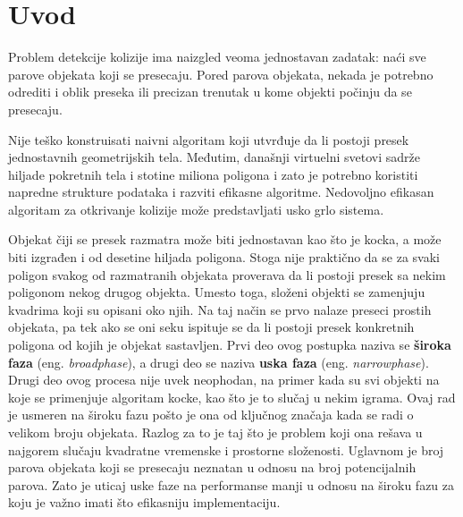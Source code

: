 \documentclass[12pt,oneside]{memoir}
\begin{document}
\frontmatter

\naslovna
\komisija

\begingroup
\vspace*{-5\baselineskip}
\tableofcontents
\endgroup

\mainmatter

\chapter{Uvod}
\label{sec:uvod}

Problem detekcije kolizije ima naizgled veoma jednostavan zadatak: naći sve parove objekata
koji se presecaju. Pored parova objekata, nekada je potrebno odrediti i oblik preseka
ili precizan trenutak u kome objekti počinju da se presecaju.

Nije teško konstruisati naivni algoritam koji utvrđuje da li postoji presek jednostavnih geometrijskih tela.
Međutim, današnji virtuelni svetovi sadrže hiljade pokretnih tela i stotine miliona poligona i 
zato je potrebno koristiti napredne strukture podataka i razviti efikasne algoritme. 
Nedovoljno efikasan algoritam za otkrivanje kolizije može predstavljati usko grlo sistema.

Objekat čiji se presek razmatra može biti jednostavan kao što je kocka, a može biti izgrađen i od desetine hiljada poligona.
Stoga nije praktično da se za svaki poligon svakog od razmatranih objekata
proverava da li postoji presek sa nekim poligonom nekog drugog objekta.
Umesto toga, složeni objekti se zamenjuju kvadrima koji su opisani oko njih.
Na taj način se prvo nalaze preseci prostih objekata, pa tek ako se oni seku ispituje se da li postoji presek konkretnih poligona od kojih je objekat sastavljen.
%
Prvi deo ovog postupka naziva se \textbf{široka faza} (eng. {\em broadphase}), a drugi deo se naziva \textbf{uska faza} (eng. {\em narrowphase}).
Drugi deo ovog procesa nije uvek neophodan, na primer kada su svi objekti na koje se primenjuje algoritam kocke, kao što je to slučaj u nekim igrama.
Ovaj rad je usmeren na široku fazu pošto je ona od ključnog značaja kada se radi o velikom broju objekata.
Razlog za to je taj što je problem koji ona rešava u najgorem slučaju kvadratne vremenske i prostorne složenosti.
Uglavnom je broj parova objekata koji se presecaju neznatan u odnosu na broj potencijalnih parova. 
Zato je uticaj uske faze na performanse manji u odnosu na široku fazu za koju je važno imati što efikasniju implementaciju.
\end{document}
